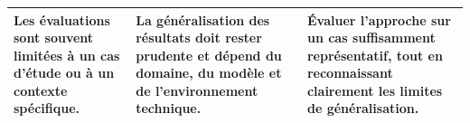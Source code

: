\begin{table}[H]
\begin{tabularx}{\textwidth}{p{3.7cm}p{4.4cm}X}

Les évaluations sont souvent limitées à un cas d'étude ou à un contexte spécifique.
& La généralisation des résultats doit rester prudente et dépend du domaine, du modèle et de l'environnement technique.
& Évaluer l'approche sur un cas suffisamment représentatif, tout en reconnaissant clairement les limites de généralisation. \\

\bottomrule
\end{tabularx}
\end{table}




